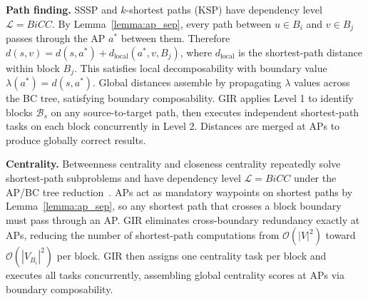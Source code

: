 

\textbf{Path finding.}
SSSP and $k$-shortest paths (KSP) have dependency level $\mathcal{L} = \textit{BiCC}$.
By Lemma~\ref{lemma:ap_sep}, every path between $u \in B_i$ and $v \in B_j$
passes through the AP $a^*$ between them.
Therefore $d(s, v) = d(s, a^*) + d_\text{local}(a^*, v, B_j)$,
where $d_\text{local}$ is the shortest-path distance within block $B_j$.
This satisfies local decomposability with boundary value $\lambda(a^*) = d(s, a^*)$.
Global distances assemble by propagating $\lambda$ values across the BC tree,
satisfying boundary composability.
GIR applies Level 1 to identify blocks $\mathcal{B}_s$ on any source-to-target path,
then executes independent shortest-path tasks on each block concurrently in Level 2.
Distances are merged at APs to produce globally correct results.

\textbf{Centrality.}
Betweenness centrality and closeness centrality
repeatedly solve shortest-path subproblems and
have dependency level $\mathcal{L} = \textit{BiCC}$
under the AP/BC tree reduction~\cite{wang2016articulation}.
APs act as mandatory waypoints on shortest paths
by Lemma~\ref{lemma:ap_sep},
so any shortest path that crosses a block boundary must pass through an AP.
GIR eliminates cross-boundary redundancy exactly at APs,
reducing the number of shortest-path computations from $\mathcal{O}(|V|^2)$
toward $\mathcal{O}(|V_{B_i}|^2)$ per block.
GIR then assigns one centrality task per block and executes all tasks concurrently,
assembling global centrality scores at APs via boundary composability.





